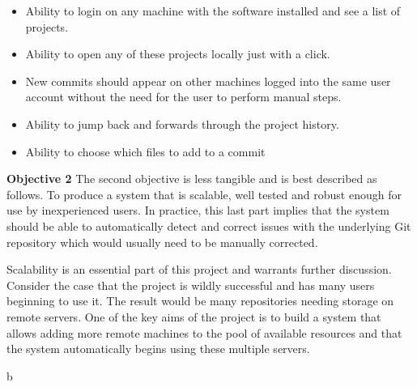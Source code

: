\begin{itemize}
\item Ability to login on any machine with the software installed and see a list of projects.
\item Ability to open any of these projects locally just with a click.
\item New commits should appear on other machines logged into the same user account without the need for the user to perform manual steps.
\item Ability to jump back and forwards through the project history.
\item \color{red}Ability to choose which files to add to a commit \color{black}
\end{itemize}

\noindent \textbf{Objective 2} The second objective is less tangible and is best described as follows. To produce a system that is scalable, well tested and robust enough for use by inexperienced users. In practice, this last part implies that the system should be able to automatically detect and correct issues with the underlying Git repository which would usually need to be manually corrected.

Scalability is an essential part of this project and warrants further discussion. Consider the case that the project is wildly successful and has many users beginning to use it. The result would be many repositories needing storage on remote servers. One of the key aims of the project is to build a system that allows adding more remote machines to the pool of available resources and that the system automatically begins using these multiple servers.

b